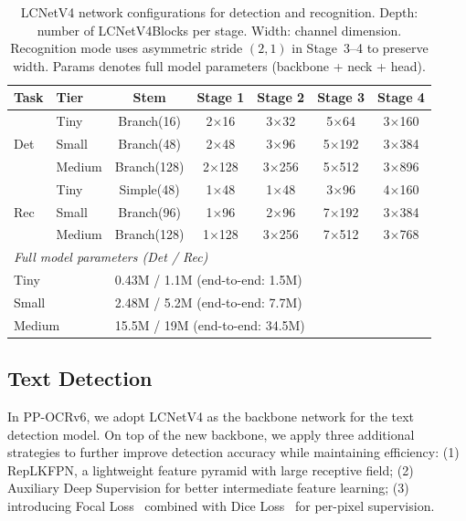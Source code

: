 \documentclass[11pt, a4paper,logo,  copyright, nonumbering]{paddleocr}
\begin{document}
\begin{table}[t]
\centering
\small
\begin{tabular}{llccccc}
\toprule
\textbf{Task} & \textbf{Tier} & \textbf{Stem} & \textbf{Stage 1} & \textbf{Stage 2} & \textbf{Stage 3} & \textbf{Stage 4} \\
\midrule
\multirow{3}{*}{Det} & Tiny & Branch(16) & 2$\times$16 & 3$\times$32 & 5$\times$64 & 3$\times$160 \\
 & Small & Branch(48) & 2$\times$48 & 3$\times$96 & 5$\times$192 & 3$\times$384 \\
 & Medium & Branch(128) & 2$\times$128 & 3$\times$256 & 5$\times$512 & 3$\times$896 \\
\midrule
\multirow{3}{*}{Rec} & Tiny & Simple(48) & 1$\times$48 & 1$\times$48 & 3$\times$96 & 4$\times$160 \\
 & Small & Branch(96) & 1$\times$96 & 2$\times$96 & 7$\times$192 & 3$\times$384 \\
 & Medium & Branch(128) & 1$\times$128 & 3$\times$256 & 7$\times$512 & 3$\times$768 \\
\midrule
\multicolumn{7}{l}{\textit{Full model parameters (Det / Rec)}} \\
\multicolumn{2}{l}{\quad Tiny} & \multicolumn{5}{l}{0.43M / 1.1M \quad (end-to-end: 1.5M)} \\
\multicolumn{2}{l}{\quad Small} & \multicolumn{5}{l}{2.48M / 5.2M \quad (end-to-end: 7.7M)} \\
\multicolumn{2}{l}{\quad Medium} & \multicolumn{5}{l}{15.5M / 19M \quad (end-to-end: 34.5M)} \\
\bottomrule
\end{tabular}
\caption{LCNetV4 network configurations for detection and recognition. Depth: number of LCNetV4Blocks per stage. Width: channel dimension. Recognition mode uses asymmetric stride $(2,1)$ in Stage~3--4 to preserve width. Params denotes full model parameters (backbone + neck + head).}
\label{tab:net_config}
\end{table}

\subsection{Text Detection}
\label{sec:detection}
In PP-OCRv6, we adopt LCNetV4 as the backbone network for the text detection model. On top of the new backbone, we apply three additional strategies to further improve detection accuracy while maintaining efficiency: (1) RepLKFPN, a lightweight feature pyramid with large receptive field; (2) Auxiliary Deep Supervision for better intermediate feature learning; (3) introducing Focal Loss~\cite{lin2017focal} combined with Dice Loss~\cite{milletari2016v} for per-pixel supervision.
\end{document}

